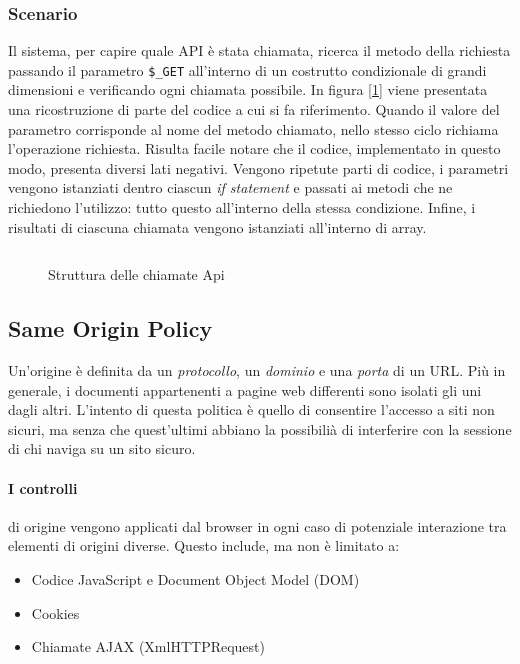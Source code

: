 \subsubsection{Scenario}
Il sistema, per capire quale API è stata chiamata, ricerca il metodo della richiesta passando il parametro \texttt{\$\_GET} all'interno di un costrutto condizionale di grandi dimensioni e verificando ogni chiamata possibile. In figura [\ref{fig:apicall}] viene presentata una ricostruzione di parte del codice a cui si fa riferimento. Quando il valore del parametro corrisponde al nome del metodo chiamato, nello stesso ciclo richiama l'operazione richiesta. Risulta facile notare che il codice, implementato in questo modo, presenta diversi lati negativi. Vengono ripetute parti di codice, i parametri vengono istanziati dentro ciascun \emph{if statement} e passati ai metodi che ne richiedono l'utilizzo: tutto questo all'interno della stessa condizione. Infine, i risultati di ciascuna chiamata vengono istanziati all'interno di array.
\begin{figure}
    \inputminted[firstline=2, lastline=15]{octave}{src/examples/old_api_call.php}
    \caption{Struttura delle chiamate Api}
    \label{fig:apicall}
\end{figure}

\subsection{Same Origin Policy}
Un'origine è definita da un \textit{protocollo}, un \textit{dominio} e una \textit{porta} di un URL. Più in generale, i documenti appartenenti a pagine web differenti sono isolati gli uni dagli altri. L'intento di questa politica è quello di consentire l'accesso a siti non sicuri, ma senza che quest'ultimi abbiano la possibilià di interferire con la sessione di chi naviga su un sito sicuro. \cite{w3c:sop}

\paragraph{I controlli} di origine vengono applicati dal browser in ogni caso di potenziale interazione tra elementi di origini diverse. Questo include, ma non è limitato a:
\begin{itemize}
    \item Codice JavaScript e Document Object Model (DOM)
    \item Cookies
    \item Chiamate AJAX (XmlHTTPRequest)
\end{itemize}

